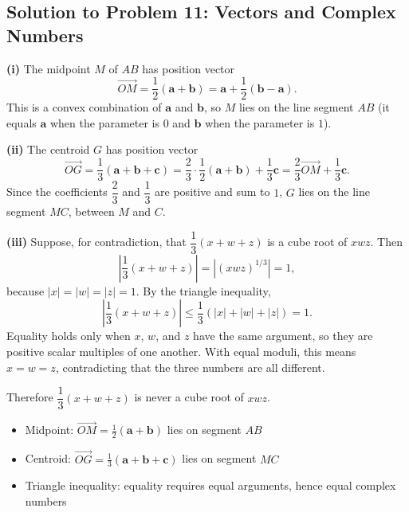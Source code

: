 \subsection{Solution to Problem 11: Vectors and Complex Numbers}

\begin{solution}
\textbf{(i)} The midpoint $M$ of $AB$ has position vector
\[
\vec{OM} = \frac{1}{2}(\mathbf{a}+\mathbf{b})
= \mathbf{a} + \frac{1}{2}(\mathbf{b}-\mathbf{a}).
\]
This is a convex combination of $\mathbf{a}$ and $\mathbf{b}$, so $M$ lies on the line segment $AB$ (it equals $\mathbf{a}$ when the parameter is $0$ and $\mathbf{b}$ when the parameter is $1$).

\textbf{(ii)} The centroid $G$ has position vector
\[
\vec{OG} = \frac{1}{3}(\mathbf{a}+\mathbf{b}+\mathbf{c})
= \frac{2}{3}\cdot\frac{1}{2}(\mathbf{a}+\mathbf{b}) + \frac{1}{3}\mathbf{c}
= \frac{2}{3}\vec{OM} + \frac{1}{3}\mathbf{c}.
\]
Since the coefficients $\dfrac{2}{3}$ and $\dfrac{1}{3}$ are positive and sum to $1$, $G$ lies on the line segment $MC$, between $M$ and $C$.

\textbf{(iii)} Suppose, for contradiction, that $\dfrac{1}{3}(x+w+z)$ is a cube root of $xwz$. Then
\[
\left|\frac{1}{3}(x+w+z)\right| = \left|(xwz)^{1/3}\right| = 1,
\]
because $|x|=|w|=|z|=1$. By the triangle inequality,
\[
\left|\frac{1}{3}(x+w+z)\right| \le \frac{1}{3}(|x|+|w|+|z|) = 1.
\]
Equality holds only when $x$, $w$, and $z$ have the same argument, so they are positive scalar multiples of one another. With equal moduli, this means $x=w=z$, contradicting that the three numbers are all different.

Therefore $\dfrac{1}{3}(x+w+z)$ is never a cube root of $xwz$.
\end{solution}

\begin{takeaways}
\begin{itemize}
    \item Midpoint: $\vec{OM}=\tfrac{1}{2}(\mathbf{a}+\mathbf{b})$ lies on segment $AB$
    \item Centroid: $\vec{OG}=\tfrac{1}{3}(\mathbf{a}+\mathbf{b}+\mathbf{c})$ lies on segment $MC$
    \item Triangle inequality: equality requires equal arguments, hence equal complex numbers
\end{itemize}
\end{takeaways}
